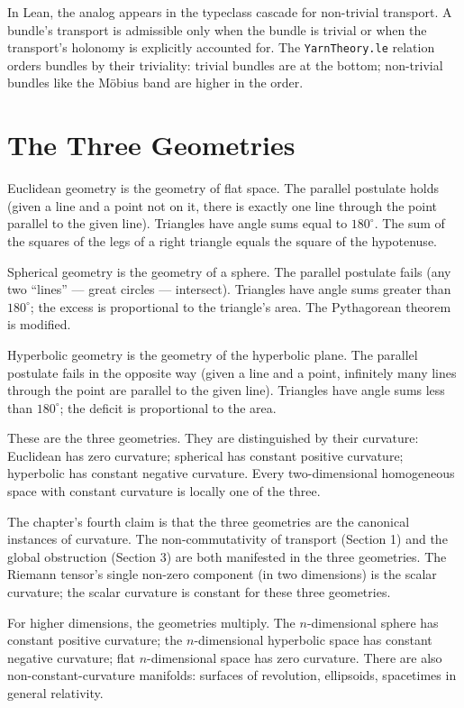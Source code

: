 In Lean, the analog appears in the typeclass cascade for
non-trivial transport. A bundle's transport is admissible only
when the bundle is trivial or when the transport's holonomy is
explicitly accounted for. The
\texttt{YarnTheory.le} relation orders bundles by their
triviality: trivial bundles are at the bottom; non-trivial
bundles like the M\"obius band are higher in the order.

\section{The Three Geometries}
\label{se:the-three-geometries}

Euclidean geometry is the geometry of flat space. The parallel
postulate holds (given a line and a point not on it, there is
exactly one line through the point parallel to the given line).
Triangles have angle sums equal to $180^\circ$. The sum of the
squares of the legs of a right triangle equals the square of the
hypotenuse.

Spherical geometry is the geometry of a sphere. The parallel
postulate fails (any two ``lines'' --- great circles --- intersect).
Triangles have angle sums greater than $180^\circ$; the excess is
proportional to the triangle's area. The Pythagorean theorem
is modified.

Hyperbolic geometry is the geometry of the hyperbolic plane. The
parallel postulate fails in the opposite way (given a line and a
point, infinitely many lines through the point are parallel to
the given line). Triangles have angle sums less than $180^\circ$;
the deficit is proportional to the area.

These are the three geometries. They are distinguished by their
curvature: Euclidean has zero curvature; spherical has constant
positive curvature; hyperbolic has constant negative curvature.
Every two-dimensional homogeneous space with constant curvature
is locally one of the three.

The chapter's fourth claim is that the three geometries are the
canonical instances of curvature. The non-commutativity of
transport (Section 1) and the global obstruction (Section 3) are
both manifested in the three geometries. The Riemann tensor's
single non-zero component (in two dimensions) is the scalar
curvature; the scalar curvature is constant for these three
geometries.

For higher dimensions, the geometries multiply. The
$n$-dimensional sphere has constant positive curvature; the
$n$-dimensional hyperbolic space has constant negative curvature;
flat $n$-dimensional space has zero curvature. There are also
non-constant-curvature manifolds: surfaces of revolution, ellipsoids,
spacetimes in general relativity.

